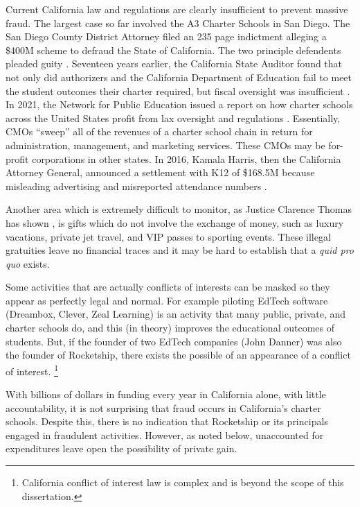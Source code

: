   Current California law and regulations are clearly insufficient to prevent massive fraud. The largest case so far involved the A3 Charter Schools in San Diego. The San Diego County District Attorney filed an 235 page indictment \parencite{SDDA2019} alleging a \$400M scheme to defraud the State of California. The two principle defendents pleaded guity \parencite{Taketa2021}.
  Seventeen years earlier, the California State Auditor found that not only did authorizers and the California Department of Education fail to meet the student outcomes their charter required, but fiscal oversight was insufficient \parencite{CAStateAuditor2002}. In 2021, the Network for Public Education issued a report on how charter schools across the United States profit from lax oversight and regulations \parencite{Burris.Cimarusti2021}. Essentially, CMOs ``sweep'' all of the revenues of a charter school chain in return for administration, management, and marketing services. These CMOs may be for-profit corporations in other states. In 2016, Kamala Harris, then the California Attorney General, announced a settlement with K12 of \$168.5M because misleading advertising and misreported attendance numbers \parencite{Agpressoffice2016}.

  Another area which is extremely difficult to monitor, as Justice Clarence Thomas has shown \parencite{Murphy.Mierjeski2023}, is gifts which do not involve the exchange of money, such as luxury vacations, private jet travel, and VIP passes to sporting events. These illegal gratuities leave no financial traces and it may be hard to establish that a \textit{quid pro quo} exists. 

  Some activities that are actually conflicts of interests can be masked so they appear as perfectly legal and normal. For example piloting EdTech software (Dreambox, Clever, Zeal Learning) is an activity that many public, private, and charter schools do, and this (in theory) improves the educational outcomes of students. But, if the founder of two EdTech companies (John Danner) was also the founder of Rocketship, there exists the possible of an appearance of a conflict of interest.
\footnote{ California conflict of interest law is complex \parencite{Chaney.etal2010a} and is beyond the scope of this dissertation.}

With billions of dollars in funding every year in California alone, with little accountability, it is not surprising that fraud occurs in California's charter schools. Despite this, there is no indication that Rocketship or its principals engaged in fraudulent activities. However, as noted below, unaccounted for expenditures leave open the possibility of private gain. 


